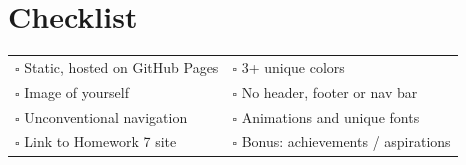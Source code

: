 \documentclass[11pt]{article}
\begin{document}
\section*{Checklist}
\begin{tabular}{@{}ll@{}}
$\square$ Static, hosted on GitHub Pages & $\square$ 3+ unique colors\\
$\square$ Image of yourself & $\square$ No header, footer or nav bar\\
$\square$ Unconventional navigation & $\square$ Animations and unique fonts\\
$\square$ Link to Homework 7 site & $\square$ Bonus: achievements / aspirations\\
\end{tabular}
\end{document}
